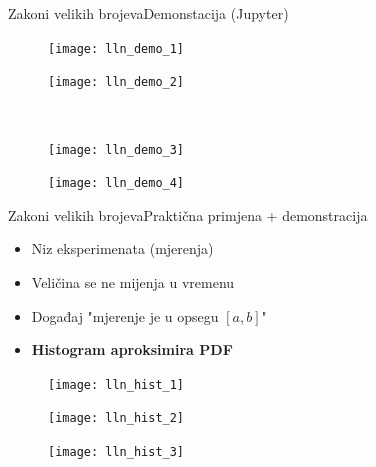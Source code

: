 \documentclass[aspectratio=169]{beamer}
\begin{document}
  \begin{frame}{Zakoni velikih brojeva}{Demonstacija (Jupyter)}
    \vspace{10pt}
    \begin{figure}
      \begin{minipage}[b]{0.27\linewidth}
        \centering
        \texttt{[image: lln\_demo\_1]}
      \end{minipage}
      \begin{minipage}[b]{0.27\linewidth}
        \centering
        \texttt{[image: lln\_demo\_2]}
      \end{minipage}
      \\
      \begin{minipage}[b]{0.27\linewidth}
        \centering
        \texttt{[image: lln\_demo\_3]}
      \end{minipage}
      \begin{minipage}[b]{0.27\linewidth}
        \centering
        \texttt{[image: lln\_demo\_4]}
      \end{minipage}
    \end{figure}
  \end{frame}
  
  \begin{frame}{Zakoni velikih brojeva}{Praktična primjena + demonstracija}
    \begin{itemize}
      \item Niz eksperimenata (mjerenja)
      \item Veličina se ne mijenja u vremenu
      \item Događaj "mjerenje je u opsegu $[a,b]$"
      \item \textbf{Histogram aproksimira PDF}
    \end{itemize}
    \begin{figure}
      \begin{minipage}[b]{0.27\linewidth}
        \centering
        \texttt{[image: lln\_hist\_1]}
      \end{minipage}
      \hspace{0.5cm}
      \begin{minipage}[b]{0.27\linewidth}
        \centering
        \texttt{[image: lln\_hist\_2]}
      \end{minipage}
      \hspace{0.5cm}
      \begin{minipage}[b]{0.27\linewidth}
        \centering
        \texttt{[image: lln\_hist\_3]}
      \end{minipage}
    \end{figure}
  \end{frame}
\end{document}
